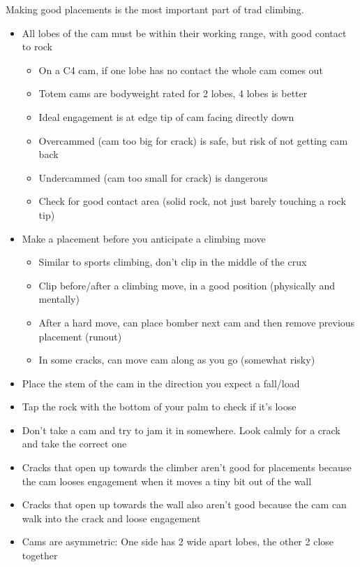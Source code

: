 Making good placements is the most important part of trad climbing. 
\begin{itemize}
\item All lobes of the cam must be within their working range, with good contact to rock
	\begin{itemize}
	\item On a C4 cam, if one lobe has no contact the whole cam comes out
	\item Totem cams are bodyweight rated for 2 lobes, 4 lobes is better
	\item Ideal engagement is at edge tip of cam facing directly down
	\item Overcammed (cam too big for crack) is safe, but risk of not getting cam back
	\item Undercammed (cam too small for crack) is dangerous
	\item Check for good contact area (solid rock, not just barely touching a rock tip)
	\end{itemize}
\item Make a placement before you anticipate a climbing move
	\begin{itemize}
	\item Similar to sports climbing, don't clip in the middle of the crux
	\item Clip before/after a climbing move, in a good position (physically and mentally)
	\item After a hard move, can place bomber next cam and then remove previous placement (runout)
	\item In some cracks, can move cam along as you go (somewhat risky)
	\end{itemize}
\item Place the stem of the cam in the direction you expect a fall/load
\item Tap the rock with the bottom of your palm to check if it's loose
\item Don't take a cam and try to jam it in somewhere. Look calmly for a crack and take the correct one
\item Cracks that open up towards the climber aren't good for placements because the cam looses engagement when it moves a tiny bit out of the wall
\item Cracks that open up towards the wall also aren't good because the cam can walk into the crack and loose engagement
\item Cams are asymmetric: One side has 2 wide apart lobes, the other 2 close together
	\begin{itemize} 

\end{itemize}
\end{itemize}
